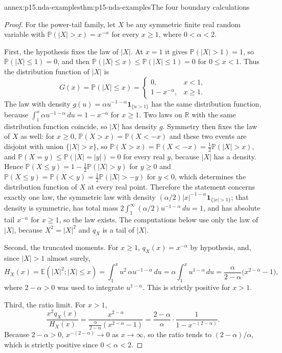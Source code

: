 \begin{annexitem}{annex:p15.nda-examples}{thm:p15-nda-examples}{The four boundary calculations}
\begin{proof}
For the power-tail family, let \(X\) be any symmetric finite
real random variable with \(\mathbb P(|X|>x)=x^{-\alpha}\) for
every \(x\geq1\), where \(0<\alpha<2\).

First, the hypothesis fixes the law of \(|X|\).
At \(x=1\) it gives \(\mathbb P(|X|>1)=1\), so
\(\mathbb P(|X|\leq1)=0\), and then
\(\mathbb P(|X|\leq x)\leq\mathbb P(|X|\leq1)=0\) for \(0\leq x<1\).
Thus the distribution function of \(|X|\) is
\[
 G(x)=\mathbb P(|X|\leq x)=
 \begin{cases}0,&x<1,\\ 1-x^{-\alpha},&x\geq1.\end{cases}
 \]
The law with density \(g(u)=\alpha u^{-1-\alpha}\mathbf1_{\{u>1\}}\)
has the same distribution function, because
\(\int_1^x\alpha u^{-1-\alpha}\,du=1-x^{-\alpha}\) for \(x\geq1\).
Two laws on \(\mathbb R\) with the same distribution function
coincide, so \(|X|\) has density \(g\).
Symmetry then fixes the law of \(X\) as well: for \(x\geq0\),
\(\mathbb P(X>x)=\mathbb P(X<-x)\) and these two events are
disjoint with union \(\{|X|>x\}\), so
\(\mathbb P(X>x)=\mathbb P(X<-x)=\tfrac12\mathbb P(|X|>x)\),
and \(\mathbb P(X=y)\leq\mathbb P(|X|=|y|)=0\) for every real
\(y\), because \(|X|\) has a density. Hence
\(\mathbb P(X\leq y)=1-\tfrac12\mathbb P(|X|>y)\) for \(y\geq0\)
and \(\mathbb P(X\leq y)=\mathbb P(X<y)=\tfrac12\mathbb P(|X|>-y)\)
for \(y<0\), which determines the distribution function of \(X\)
at every real point. Therefore the statement concerns exactly one law,
the symmetric law with density
\((\alpha/2)|x|^{-1-\alpha}\mathbf1_{\{|x|>1\}}\); that density is
symmetric, has total mass \(2\int_1^\infty(\alpha/2)u^{-1-\alpha}\,du=1\),
and has absolute tail \(x^{-\alpha}\) for \(x\geq1\), so the
law exists. The computations below use only the law of \(|X|\),
because \(X^2=|X|^2\) and \(q_X\) is a tail of \(|X|\).

Second, the truncated moments. For \(x\geq1\),
\(q_X(x)=x^{-\alpha}\) by hypothesis, and, since \(|X|>1\)
almost surely,
\[
 H_X(x)=\mathbb E(|X|^2;|X|\leq x)
       =\int_1^x u^2\,\alpha u^{-1-\alpha}\,du
       =\alpha\int_1^x u^{1-\alpha}\,du
       =\frac{\alpha}{2-\alpha}\bigl(x^{2-\alpha}-1\bigr),
 \]
where \(2-\alpha>0\) was used to integrate \(u^{1-\alpha}\).
This is strictly positive for \(x>1\).

Third, the ratio limit. For \(x>1\),
\[
 \frac{x^2q_X(x)}{H_X(x)}
 =\frac{x^{2-\alpha}}{\frac{\alpha}{2-\alpha}(x^{2-\alpha}-1)}
 =\frac{2-\alpha}{\alpha}\cdot\frac1{1-x^{-(2-\alpha)}} .
 \]
Because \(2-\alpha>0\), \(x^{-(2-\alpha)}\to0\) as
\(x\to\infty\), so the ratio tends to
\((2-\alpha)/\alpha\), which is strictly positive since
\(0<\alpha<2\).


\end{proof}
\end{annexitem}
